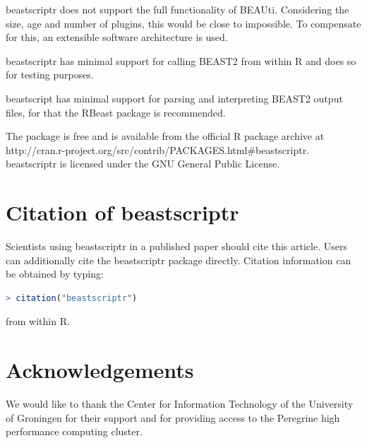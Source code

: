 \documentclass{article}
\begin{document}
beastscriptr does not support the full functionality of BEAUti. Considering
the size, age and number of plugins, this would be close to impossible.
To compensate for this, an extensible software architecture is used.

beastscriptr has minimal support for calling BEAST2 from within R and does
so for testing purposes. 

beastscript has minimal support for parsing and interpreting BEAST2 output files,
for that the RBeast package is recommended.

The package is free and is available from the official R package archive at 
http://cran.r-project.org/src/contrib/PACKAGES.html\#beastscriptr. 
beastscriptr is licensed under the GNU General Public License.


\section{Citation of beastscriptr}

Scientists using beastscriptr in a published paper should cite this
article. Users can additionally cite the beastscriptr package 
directly. Citation information can be obtained by typing:

\begin{lstlisting}[language=R]
> citation("beastscriptr")
\end{lstlisting}

from within R.

\section*{Acknowledgements}

We would like to thank the Center for Information Technology of the University of Groningen for their support
and for providing access to the Peregrine high performance computing cluster.




\begin{thebibliography}{}

\end{thebibliography}
\end{document}
